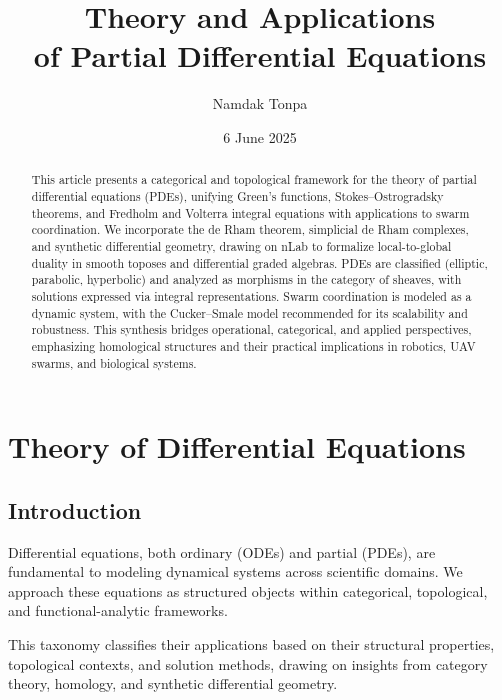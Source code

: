 \documentclass{article}
\theoremstyle{plain}
\begin{document}
\title{Theory and Applications \\ of Partial Differential Equations}
\author{Namdak Tonpa}
\date{6 June 2025}
\maketitle

\begin{abstract}
This article presents a categorical and topological framework for the theory
of partial differential equations (PDEs), unifying Green's functions,
Stokes--Ostrogradsky theorems, and Fredholm and Volterra integral
equations with applications to swarm coordination. We incorporate
the de Rham theorem, simplicial de Rham complexes,
and synthetic differential geometry, drawing on nLab to formalize
local-to-global duality in smooth toposes and differential graded algebras.
PDEs are classified (elliptic, parabolic, hyperbolic) and
analyzed as morphisms in the category of sheaves, with solutions expressed
via integral representations. Swarm coordination is modeled as a dynamic
system, with the Cucker--Smale model recommended for its scalability and
robustness. This synthesis bridges operational, categorical, and applied
perspectives, emphasizing homological structures and their practical
implications in robotics, UAV swarms, and biological systems.
\end{abstract}


\tableofcontents

\section{Theory of Differential Equations}

\subsection{Introduction}

Differential equations, both ordinary (ODEs) and partial (PDEs),
are fundamental to modeling dynamical systems across scientific domains.
We approach these equations as structured objects within categorical,
topological, and functional-analytic frameworks.

This taxonomy classifies their applications based on their structural properties,
topological contexts, and solution methods, drawing on insights from category theory,
homology, and synthetic differential geometry.
\end{document}
